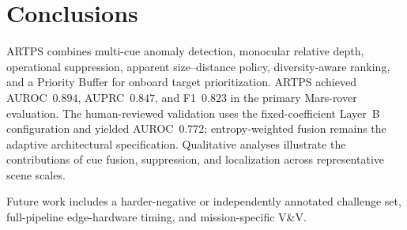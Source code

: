 \section{Conclusions}
\label{sec:conclusion}
ARTPS combines multi-cue anomaly detection, monocular relative depth, operational suppression,
apparent size--distance policy, diversity-aware ranking, and a Priority Buffer for onboard
target prioritization.
ARTPS achieved AUROC~$0.894$, AUPRC~$0.847$, and F1~$0.823$ in the primary Mars-rover
evaluation.
The human-reviewed validation uses the fixed-coefficient Layer~B configuration and yielded
AUROC~$0.772$; entropy-weighted fusion remains the adaptive architectural specification.
Qualitative analyses illustrate the contributions of cue fusion, suppression, and localization
across representative scene scales.

Future work includes a harder-negative or independently annotated challenge set,
full-pipeline edge-hardware timing, and mission-specific V\&V.
